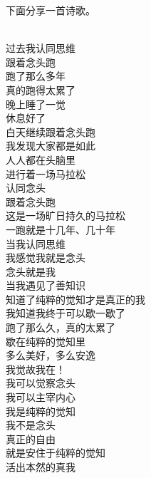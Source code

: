 下面分享一首诗歌。

\begin{poem}[我觉故我在]
    \begin{multicols}{3}
        \begin{center}~\\
            过去我认同思维 \\ 跟着念头跑 \\ 跑了那么多年 \\ 真的跑得太累了 \\ 晚上睡了一觉 \\ 休息好了 \\ 白天继续跟着念头跑 \\ 我发现大家都是如此 \\ 人人都在头脑里 \\ 进行着一场马拉松 \\ 认同念头 \\ 跟着念头跑 \\ 这是一场旷日持久的马拉松 \\ 一跑就是十几年、几十年 \\ 当我认同思维 \\ 我感觉我就是念头 \\ 念头就是我 \\ 当我遇见了善知识 \\ 知道了纯粹的觉知才是真正的我 \\ 我知道我终于可以歇一歇了 \\ 跑了那么久，真的太累了 \\ 歇在纯粹的觉知里 \\ 多么美好，多么安逸 \\ 我觉故我在！ \\ 我可以觉察念头 \\ 我可以主宰内心 \\ 我是纯粹的觉知 \\ 我不是念头 \\ 真正的自由 \\ 就是安住于纯粹的觉知 \\ 活出本然的真我
        \end{center}
    \end{multicols}
\end{poem}
